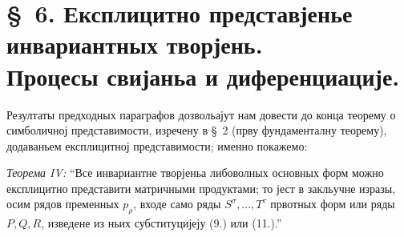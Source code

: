 ﻿\documentclass[11pt]{article}
\begin{document}
\section*{\S\ 6. Експлицитно представјенье инвариантных творјень.\\Процесы свијаньа и диференциације.}

Резултаты предходных параграфов дозвольајут нам довести до конца теорему о симболичној представимости, изречену в \S\ 2 (прву фундаменталну теорему), додаваньем експлицитној представимости; именно покажемо:

\emph{Теорема IV:} ``Все инвариантне творјеньа либоволных основных форм можно експлицитно представити матричными продуктами; то јест в закльучне изразы, осим рядов пременных $p_\rho$, входе само ряды $S^\sigma,\ldots,T^\tau$ првотных форм или ряды $P,Q,R$, изведене из ньих субституцијеју (9.) или (11.).''
\end{document}
